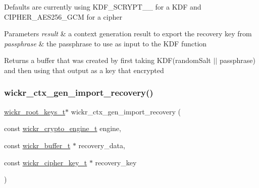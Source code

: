 Defaults are currently using K\+D\+F\+\_\+\+S\+C\+R\+Y\+P\+T\+\_\+\_ for a K\+DF and C\+I\+P\+H\+E\+R\+\_\+\+A\+E\+S256\+\_\+\+G\+CM for a cipher


\begin{DoxyParams}{Parameters}
{\em result} & a context generation result to export the recovery key from \\
\hline
{\em passphrase} & the passphrase to use as input to the K\+DF function \\
\hline
\end{DoxyParams}
\begin{DoxyReturn}{Returns}
a buffer that was created by first taking K\+DF(random\+Salt $\vert$$\vert$ passphrase) and then using that output as a key that encrypted 
\end{DoxyReturn}
\mbox{\label{group__wickr__ctx_ga0bde95494141673604b9e4e1f7954e2c}} 
\subsubsection{\texorpdfstring{wickr\_ctx\_gen\_import\_recovery()}{wickr\_ctx\_gen\_import\_recovery()}}
{\footnotesize\ttfamily \mbox{\hyperlink{structwickr__root__keys}{wickr\+\_\+root\+\_\+keys\+\_\+t}}$\ast$ wickr\+\_\+ctx\+\_\+gen\+\_\+import\+\_\+recovery (\begin{DoxyParamCaption}\item[{const \mbox{\hyperlink{structwickr__crypto__engine}{wickr\+\_\+crypto\+\_\+engine\+\_\+t}}}]{engine,  }\item[{const \mbox{\hyperlink{structwickr__buffer}{wickr\+\_\+buffer\+\_\+t}} $\ast$}]{recovery\+\_\+data,  }\item[{const \mbox{\hyperlink{structwickr__cipher__key}{wickr\+\_\+cipher\+\_\+key\+\_\+t}} $\ast$}]{recovery\+\_\+key }\end{DoxyParamCaption})}


